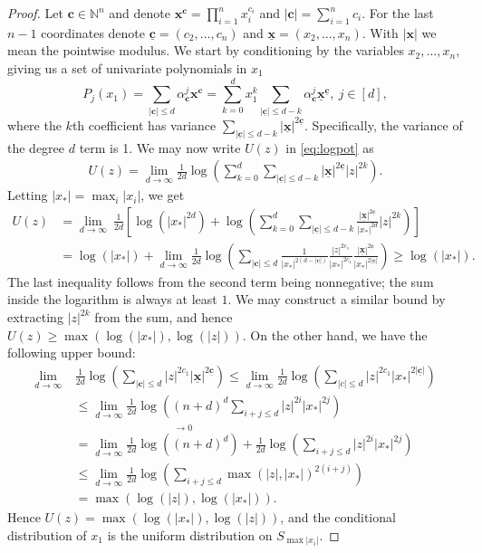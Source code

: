 \documentclass[12pt]{article}
\def\N{\mathbb{N}}
\def\xx{\mathbf{x}}
\def\cc{\mathbf{c}}
\def\xu{\underline{\xx}}
\def\cu{\underline{\cc}}
\begin{document}
\begin{proof}
 Let $\cc \in \N^{n}$ and denote $\xx^\cc = \prod_{i=1}^n x_i^{c_i}$ and $|\cc| = \sum_{i=1}^n c_i$. For the last $n-1$ coordinates denote $\cu = (c_2,\dots,c_n)$ and $\xu = (x_2,\dots,x_n)$. With $|\xx|$ we mean the pointwise modulus.
    We start by conditioning by the variables $x_2,\dots,x_n$, giving us a set of univariate polynomials in $x_1$
    \[ P_j(x_1) = \sum_{|\cc| \leq d} \alpha_{\cc}^j \xx^\cc = \sum_{k = 0}^d x_1^{k} \sum_{|\cu| \leq d-k} \alpha_{\cc}^j \xu^{\cu}, ~j \in [d], \]
    where the $k$th coefficient has variance $\sum_{|\cu| \leq d-k} |\xu|^{2\cu}$. Specifically, the variance of the degree $d$ term is 1.
    We may now write $U(z)$ in \eqref{eq:logpot} as
    \begin{align*}
        U(z) = \lim_{d\to\infty} \frac{1}{2d} \log \left( \sum_{k=0}^d  \sum_{|\cu| \leq d-k} |\xu|^{2\cu}  |z|^{2k} \right).
    \end{align*}
    Letting $|x_*| = \max_{i} |x_i|$, we get
    \begin{align*}
        U(z) &= \lim_{d\to \infty} ~\frac{1}{2d}\left[ \log(|x_*|^{2d}) + \log \left( \sum_{k=0}^d \sum_{|\cu| \leq d-k} \frac{|\xu|^{2\cu}}{|x_*|^{2d}}  |z|^{2k} \right) \right] \\
        &=  \log(|x_*|) + \lim_{d\to \infty}\frac{1}{2d} \log \left( \sum_{|\cc| \leq d} \frac{1}{|x_*|^{2(d-|\cc|)}} \frac{|z|^{2c_1}}{|x_*|^{2c_1}} \frac{|\xu|^{2\cu}}{|x_*|^{2|\cu|}} \right) \geq \log(|x_*|).
    \end{align*}
    The last inequality follows from the second term being nonnegative; the sum inside the logarithm is always at least $1$. 
    We may construct a similar bound by extracting $|z|^{2k}$ from the sum, and hence $U(z) \geq \max(\log(|x_*|),\log(|z|))$.
    On the other hand, we have the following upper bound:
    \begin{align*} 
    \lim_{d\to \infty} ~&\frac{1}{2d} \log \left(\sum_{|\cc|\leq d} |z|^{2c_1} |\xu|^{2\cu} \right) \leq \lim_{d\to \infty} \frac{1}{2d} \log \left( \sum_{|c|\leq d} |z|^{2c_1}|x_*|^{2|\cu|} \right) \\
    &\leq \lim_{d\to \infty} \frac{1}{2d} \log \left( (n+d)^d \sum_{i+j \leq d} |z|^{2i} |x_*|^{2j} \right) \\
    &= \lim_{d\to \infty} \stackrel{\to 0}{\frac{1}{2d} \log \left( (n+d)^d \right)} + \frac{1}{2d} \log \left( \sum_{i+j \leq d} |z|^{2i} |x_*|^{2j} \right) \\
    &\leq \lim_{d\to \infty} \frac{1}{2d}\log \left( \sum_{i+j \leq d} \max (|z|, |x_*|)^{2(i+j)} \right) \\
    &=\max( \log (|z|), \log(|x_*|)).
    \end{align*}
    Hence $U(z) = \max(\log(|x_*|), \log(|z|))$, and the conditional distribution of $x_1$ is the uniform distribution on $S_{\max |x_i|}$.


\end{proof}
\end{document}
